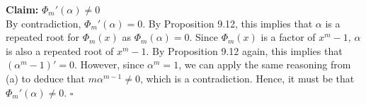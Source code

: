 \documentclass{article}
\begin{document}
\begin{enumerate}
\begin{enumerate}
    \textbf{Claim:} $\Phi_m'(\alpha) \neq 0$ \\

    By contradiction, $\Phi_m'(\alpha) = 0$. By Proposition 9.12, this implies that $\alpha$ is a repeated root for $\Phi_m(x)$ as $\Phi_m(\alpha) = 0$. Since $\Phi_m(x)$ is a factor of $x^m - 1$, $\alpha$ is also a repeated root of $x^m - 1$. By Proposition 9.12 again, this implies that $(\alpha^m - 1)' = 0$. However, since $\alpha^m = 1$, we can apply the same reasoning from (a) to deduce that $m\alpha^{m-1} \neq 0$, which is a contradiction. Hence, it must be that $\Phi_m'(\alpha) \neq 0$.  \hfill $\square$



\end{enumerate}



\end{enumerate}
\end{document}
